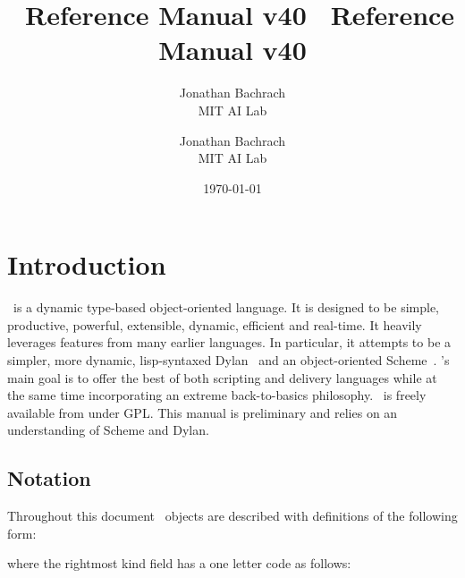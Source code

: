 \documentclass[twoside,twocolumn,9pt]{extarticle}
\begin{document}
\label{top_node}

\T\sloppy    %

\T\title{{\Huge \goo\ Reference Manual v40 }}
\T\author{{\huge Jonathan Bachrach} \\ {\Large MIT AI Lab}}
\W\title{{\huge \goo\ Reference Manual v40 }}
\W\author{{\Large Jonathan Bachrach} \\ {\Large MIT AI Lab}}
\date{\today}


\maketitle

\section{Introduction}

\goo\ is a dynamic type-based object-oriented language.  It is
designed to be simple, productive, powerful, extensible, dynamic,
efficient and real-time.  It heavily leverages features from many
earlier languages.  In particular, it attempts to be a simpler,
more dynamic, lisp-syntaxed Dylan~\cite{Shalit:1996} and an object-oriented 
Scheme~\cite{Kelsey:Clinger:Rees:hosc:1998}.
\goo's main goal is to offer the best of both scripting and
delivery languages while at the same time 
incorporating an extreme back-to-basics philosophy.
\goo\ is freely available from  under GPL.
This manual is preliminary and relies on an understanding
of Scheme and Dylan.

\subsection{Notation}

Throughout this document \goo\ objects are described with definitions
of the following form:

\begin{defs}
\end{defs}

where the rightmost kind field has a one letter code as follows:

\begin{defs}
\end{defs}
\end{document}
